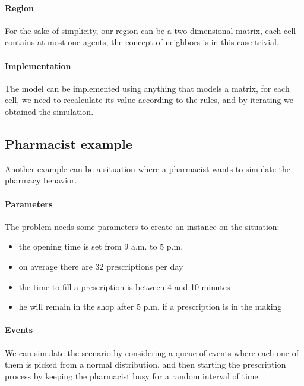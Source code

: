 \paragraph{Region}
For the sake of simplicity, our region can be a two dimensional matrix, 
each cell contains at most one agents, the concept of neighbors is 
in this case trivial.

\paragraph{Implementation}
The model can be implemented using anything that models a matrix, 
for each cell, we need to recalculate its value according
to the rules, and by iterating we obtained the simulation.

\subsection{Pharmacist example}
Another example can be a situation where a pharmacist wants to
simulate the pharmacy behavior.

\paragraph{Parameters}
The problem needs some parameters to create an instance on the 
situation:
\begin{itemize}
    \item the opening time is set from 9 a.m. to 5 p.m.
    \item on average there are 32 prescriptions per day
    \item the time to fill a prescription is between 4 and 10 minutes
    \item he will remain in the shop after 5 p.m. if a prescription is 
    in the making
\end{itemize}
\paragraph{Events}
We can simulate the scenario by considering a queue of events 
where each one of them is picked from a normal distribution, and 
then starting the prescription process by keeping the pharmacist busy for 
a random interval of time.

